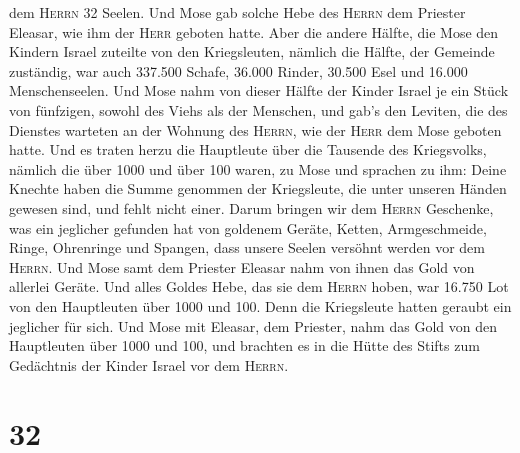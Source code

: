 dem \textsc{Herrn} 32 Seelen.  Und Mose gab solche Hebe
des \textsc{Herrn} dem Priester Eleasar, wie ihm der \textsc{Herr}
geboten hatte.  Aber die andere Hälfte, die Mose den
Kindern Israel zuteilte von den Kriegsleuten,  nämlich
die Hälfte, der Gemeinde zuständig, war auch 337.500 Schafe,
 36.000 Rinder,  30.500 Esel
 und 16.000 Menschenseelen.  Und Mose nahm
von dieser Hälfte der Kinder Israel je ein Stück von fünfzigen, sowohl
des Viehs als der Menschen, und gab's den Leviten, die des Dienstes
warteten an der Wohnung des \textsc{Herrn}, wie der \textsc{Herr} dem
Mose geboten hatte.  Und es traten herzu die Hauptleute
über die Tausende des Kriegsvolks, nämlich die über 1000 und über 100
waren, zu Mose  und sprachen zu ihm: Deine Knechte haben
die Summe genommen der Kriegsleute, die unter unseren Händen gewesen
sind, und fehlt nicht einer.  Darum bringen wir dem
\textsc{Herrn} Geschenke, was ein jeglicher gefunden hat von goldenem
Geräte, Ketten, Armgeschmeide, Ringe, Ohrenringe und Spangen, dass
unsere Seelen versöhnt werden vor dem \textsc{Herrn}. 
Und Mose samt dem Priester Eleasar nahm von ihnen das Gold von allerlei
Geräte.  Und alles Goldes Hebe, das sie dem
\textsc{Herrn} hoben, war 16.750 Lot von den Hauptleuten über 1000 und
100.  Denn die Kriegsleute hatten geraubt ein jeglicher
für sich.  Und Mose mit Eleasar, dem Priester, nahm das
Gold von den Hauptleuten über 1000 und 100, und brachten es in die Hütte
des Stifts zum Gedächtnis der Kinder Israel vor dem \textsc{Herrn}.

\hypertarget{section-31}{%
\section{32}\label{section-31}}

